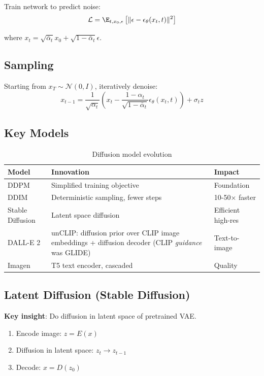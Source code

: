Train network to predict noise:
\begin{equation}
\mathcal{L} = \E_{t, x_0, \epsilon}\left[\|\epsilon - \epsilon_\theta(x_t, t)\|^2\right]
\end{equation}

where $x_t = \sqrt{\bar{\alpha}_t} x_0 + \sqrt{1-\bar{\alpha}_t} \epsilon$.

\subsection{Sampling}

Starting from $x_T \sim \mathcal{N}(0, I)$, iteratively denoise:
\begin{equation}
x_{t-1} = \frac{1}{\sqrt{\alpha_t}}\left(x_t - \frac{1-\alpha_t}{\sqrt{1-\bar{\alpha}_t}} \epsilon_\theta(x_t, t)\right) + \sigma_t z
\end{equation}

\subsection{Key Models}

\begin{table}[H]
\centering
\caption{Diffusion model evolution}
\begin{tabularx}{\textwidth}{lXX}
\toprule
\textbf{Model} & \textbf{Innovation} & \textbf{Impact} \\
\midrule
DDPM & Simplified training objective & Foundation \\
DDIM & Deterministic sampling, fewer steps & 10-50× faster \\
Stable Diffusion & Latent space diffusion & Efficient high-res \\
DALL-E 2 & unCLIP: diffusion prior over CLIP image embeddings + diffusion decoder (CLIP \textit{guidance} was GLIDE) & Text-to-image \\
Imagen & T5 text encoder, cascaded & Quality \\
\bottomrule
\end{tabularx}
\end{table}

\subsection{Latent Diffusion (Stable Diffusion)}

\textbf{Key insight}: Do diffusion in latent space of pretrained VAE.

\begin{enumerate}
    \item Encode image: $z = E(x)$
    \item Diffusion in latent space: $z_t \to z_{t-1}$
    \item Decode: $x = D(z_0)$
\end{enumerate}

